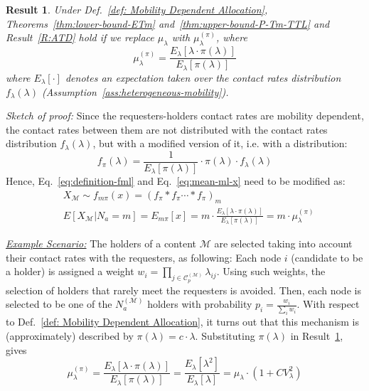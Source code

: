 \documentclass[journal]{IEEEtran}
\newtheorem{result}{Result}
\newcommand{\eq}[1]{Eq.~\eqref{#1}}
\newcommand{\Na}{N_{a}^{(\mathcal{M})}}
\newcommand{\Cp}{\mathcal{C}_{p}^{(\mathcal{M})}}
\newcommand{\XM}{{X}_{\mathcal{M}}}
\begin{document}
\begin{result}\label{R:MDA}
 Under Def.~\ref{def: Mobility Dependent Allocation}, Theorems~\ref{thm:lower-bound-ETm} and~\ref{thm:upper-bound-P-Tm-TTL} and Result~\ref{R:ATD} hold if we replace $\mu_{\lambda}$ with $\mu_{\lambda}^{(\pi)}$, where
\begin{equation}
 \mu_{\lambda}^{(\pi)} = \frac{E_{\lambda}[\lambda\cdot \pi(\lambda)]}{E_{\lambda}[\pi(\lambda)]}\nonumber
\end{equation}
where $E_{\lambda}[\cdot]$ denotes an expectation taken over the contact rates distribution $f_{\lambda}(\lambda)$ (Assumption~\ref{ass:heterogeneous-mobility}).
\end{result}
\textit{Sketch of proof:} Since the requesters-holders contact rates are mobility dependent, the contact rates between them are not distributed with the contact rates distribution $f_{\lambda}(\lambda)$, but with a modified version of it, i.e. with a distribution:
\begin{equation}
 f_{\pi}(\lambda) = \frac{1}{E_{\lambda}[\pi(\lambda)]}\cdot \pi(\lambda)\cdot f_{\lambda}(\lambda)\nonumber
\end{equation}
Hence, \eq{eq:definition-fml} and \eq{eq:mean-ml-x} need to be modified as:
\begin{align}
&\XM\sim f_{m\pi}(x) = \left(f_{\pi}\ast f_{\pi} \cdots \ast f_{\pi} \right)_{m}\nonumber\\
&E[\XM|N_{a}=m] = E_{m\pi}[x] = m\cdot \frac{E_{\lambda}[\lambda\cdot \pi(\lambda)]}{E_{\lambda}[\pi(\lambda)]}= m\cdot \mu_{\lambda}^{(\pi)}\nonumber
\end{align}

\textit{\underline{Example Scenario:}} The holders of a content $\mathcal{M}$ are selected taking into account their contact rates with the requesters, as following: Each node $i$ (candidate to be a holder) is assigned a weight $w_{i} = \prod_{j\in\Cp}\lambda_{ij}$. Using such weights, the selection of holders that rarely meet the requesters is avoided. Then, each node is selected to be one of the $\Na$ holders with probability $p_{i} = \frac{w_{i}}{\sum_{i}w_{i}}$. With respect to Def.~\ref{def: Mobility Dependent Allocation}, it turns out that this mechanism is (approximately) described by $\pi(\lambda) = c\cdot \lambda$. Substituting $\pi(\lambda)$ in Result~\ref{R:MDA}, gives
\begin{equation}
 \mu_{\lambda}^{(\pi)} = \frac{E_{\lambda}[\lambda\cdot \pi(\lambda)]}{E_{\lambda}[\pi(\lambda)]}=\frac{E_{\lambda}[\lambda^{2}]}{E_{\lambda}[\lambda]} = \mu_{\lambda}\cdot(1+CV_{\lambda}^{2})
\end{equation}
\end{document}
